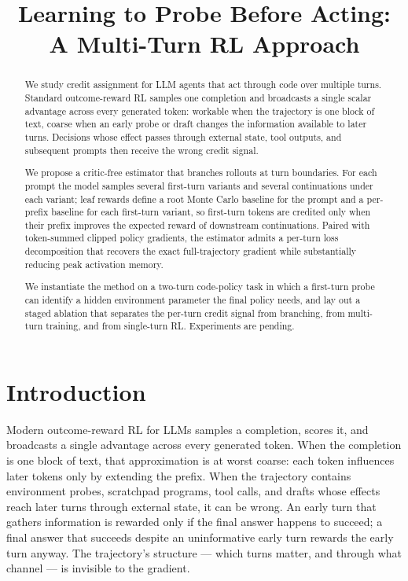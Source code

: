 \documentclass[11pt,a4paper]{article}
\title{\textbf{Learning to Probe Before Acting:\\A Multi-Turn RL Approach}}
\author{}
\date{}
\begin{document}
\maketitle


\begin{abstract}
\noindent
We study credit assignment for LLM agents that act through code over multiple turns. Standard outcome-reward RL samples one completion and broadcasts a single scalar advantage across every generated token: workable when the trajectory is one block of text, coarse when an early probe or draft changes the information available to later turns. Decisions whose effect passes through external state, tool outputs, and subsequent prompts then receive the wrong credit signal.

We propose a critic-free estimator that branches rollouts at turn boundaries. For each prompt the model samples several first-turn variants and several continuations under each variant; leaf rewards define a root Monte Carlo baseline for the prompt and a per-prefix baseline for each first-turn variant, so first-turn tokens are credited only when their prefix improves the expected reward of downstream continuations. Paired with token-summed clipped policy gradients, the estimator admits a per-turn loss decomposition that recovers the exact full-trajectory gradient while substantially reducing peak activation memory.

We instantiate the method on a two-turn code-policy task in which a first-turn probe can identify a hidden environment parameter the final policy needs, and lay out a staged ablation that separates the per-turn credit signal from branching, from multi-turn training, and from single-turn RL. Experiments are pending.
\end{abstract}

\section{Introduction}

Modern outcome-reward RL for LLMs samples a completion, scores it, and broadcasts a single advantage across every generated token. When the completion is one block of text, that approximation is at worst coarse: each token influences later tokens only by extending the prefix. When the trajectory contains environment probes, scratchpad programs, tool calls, and drafts whose effects reach later turns through external state, it can be wrong. An early turn that gathers information is rewarded only if the final answer happens to succeed; a final answer that succeeds despite an uninformative early turn rewards the early turn anyway. The trajectory's structure --- which turns matter, and through what channel --- is invisible to the gradient.
\end{document}
